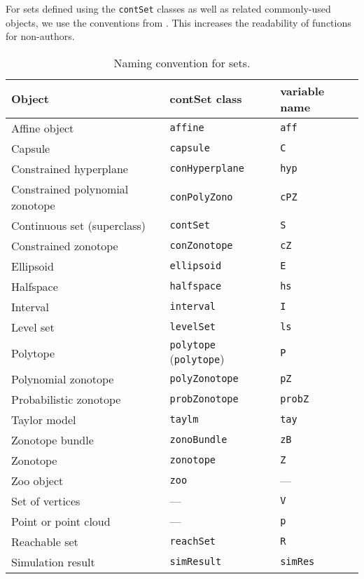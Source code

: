 
%
For sets defined using the \verb|contSet| classes as well as related commonly-used objects, we use the conventions from .
This increases the readability of functions for non-authors.

\begin{table}[h]
\centering
\caption{Naming convention for sets.}
\label{tab:contSet}
\smallskip
\begin{tabular}{l l l}
	Object & contSet class & variable name \\ \toprule
	Affine object & \verb|affine| & \verb|aff| \\
	Capsule & \verb|capsule| & \verb|C| \\
	Constrained hyperplane & \verb|conHyperplane| & \verb|hyp| \\
	Constrained polynomial zonotope & \verb|conPolyZono| & \verb|cPZ| \\
	Continuous set (superclass) & \verb|contSet| & \verb|S| \\
	Constrained zonotope & \verb|conZonotope| & \verb|cZ| \\
	Ellipsoid & \verb|ellipsoid| & \verb|E| \\
	Halfspace & \verb|halfspace| & \verb|hs| \\
	Interval & \verb|interval| & \verb|I| \\
	Level set & \verb|levelSet| & \verb|ls| \\
	Polytope & \verb|polytope| (\verb|polytope|) & \verb|P| \\
	Polynomial zonotope & \verb|polyZonotope| & \verb|pZ| \\
	Probabilistic zonotope & \verb|probZonotope| & \verb|probZ| \\
	Taylor model & \verb|taylm| & \verb|tay| \\
	Zonotope bundle & \verb|zonoBundle| & \verb|zB| \\
	Zonotope & \verb|zonotope| & \verb|Z| \\
	Zoo object & \verb|zoo| & --- \\ \bottomrule
	Set of vertices & --- & \verb|V| \\
	Point or point cloud & --- & \verb|p| \\
	Reachable set & \verb|reachSet| & \verb|R| \\
	Simulation result & \verb|simResult| & \verb|simRes| \\ \bottomrule
\end{tabular}
\end{table}

